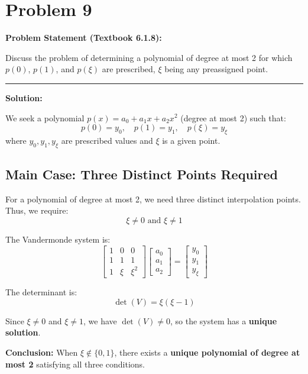 \clearpage
\section*{Problem 9}

\textbf{Problem Statement (Textbook 6.1.8):} 

Discuss the problem of determining a polynomial of degree at most 2 for which $p(0)$, $p(1)$, and $p(\xi)$ are prescribed, $\xi$ being any preassigned point.

\noindent\rule{\textwidth}{0.4pt}

\vspace{1em}

\textbf{Solution:}

We seek a polynomial $p(x) = a_0 + a_1 x + a_2 x^2$ (degree at most 2) such that:
$$p(0) = y_0, \quad p(1) = y_1, \quad p(\xi) = y_\xi$$
where $y_0, y_1, y_\xi$ are prescribed values and $\xi$ is a given point.

\subsection*{Main Case: Three Distinct Points Required}

For a polynomial of degree at most 2, we need three distinct interpolation points. Thus, we require:
$$\boxed{\xi \neq 0 \text{ and } \xi \neq 1}$$

The Vandermonde system is:
$$\begin{bmatrix} 
1 & 0 & 0 \\
1 & 1 & 1 \\
1 & \xi & \xi^2
\end{bmatrix}
\begin{bmatrix} a_0 \\ a_1 \\ a_2 \end{bmatrix}
=
\begin{bmatrix} y_0 \\ y_1 \\ y_\xi \end{bmatrix}$$

The determinant is:
$$\det(V) = \xi(\xi - 1)$$

Since $\xi \neq 0$ and $\xi \neq 1$, we have $\det(V) \neq 0$, so the system has a \textbf{unique solution}.

\textbf{Conclusion:} When $\xi \notin \{0, 1\}$, there exists a \textbf{unique polynomial of degree at most 2} satisfying all three conditions.

